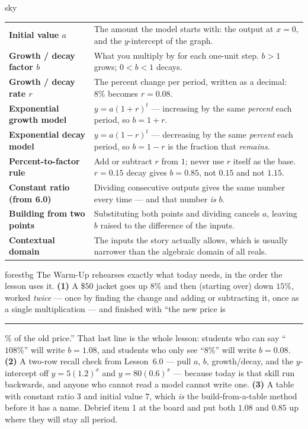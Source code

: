 \documentclass[10pt]{article}
\begin{document}
\begin{skillbox}{sky}
\renewcommand{\arraystretch}{1.3}
\begin{tabularx}{\linewidth}{@{}l X@{}}
\textbf{Initial value $a$} & The amount the model starts with: the output at $x=0$, and the $y$-intercept of the graph. \\
\textbf{Growth / decay factor $b$} & What you multiply by for each one-unit step. $b>1$ grows; $0<b<1$ decays. \\
\textbf{Growth / decay rate $r$} & The percent change per period, written as a decimal: $8\%$ becomes $r=0.08$. \\
\textbf{Exponential growth model} & $y=a(1+r)^{t}$ --- increasing by the same \emph{percent} each period, so $b=1+r$. \\
\textbf{Exponential decay model} & $y=a(1-r)^{t}$ --- decreasing by the same \emph{percent} each period, so $b=1-r$ is the fraction that \emph{remains}. \\
\textbf{Percent-to-factor rule} & Add or subtract $r$ from $1$; never use $r$ itself as the base. $r=0.15$ decay gives $b=0.85$, not $0.15$ and not $1.15$. \\
\textbf{Constant ratio (from 6.0)} & Dividing consecutive outputs gives the same number every time --- and that number \emph{is} $b$. \\
\textbf{Building from two points} & Substituting both points and dividing cancels $a$, leaving $b$ raised to the difference of the inputs. \\
\textbf{Contextual domain} & The inputs the story actually allows, which is usually narrower than the algebraic domain of all reals. \\
\end{tabularx}
\end{skillbox}

\begin{fixedskillbox}{forestbg}
    The Warm-Up rehearses exactly what today needs, in the order the lesson uses it. \textbf{(1)}
    A \$$50$ jacket goes up $8\%$ and then (starting over) down $15\%$, worked \emph{twice} --- once
    by finding the change and adding or subtracting it, once as a single multiplication --- and
    finished with ``the new price is \rule{0.7cm}{0.4pt}\% of the old price.'' That last line is the
    whole lesson: students who can say ``$108\%$'' will write $b=1.08$, and students who only see
    ``$8\%$'' will write $b=0.08$. \textbf{(2)} A two-row recall check from Lesson~6.0 --- pull $a$,
    $b$, growth/decay, and the $y$-intercept off $y=5(1.2)^{x}$ and $y=80(0.6)^{x}$ --- because
    today is that skill run backwards, and anyone who cannot read a model cannot write one.
    \textbf{(3)} A table with constant ratio $3$ and initial value $7$, which \emph{is} the
    build-from-a-table method before it has a name. Debrief item 1 at the board and put both
    $1.08$ and $0.85$ up where they will stay all period.
\end{fixedskillbox}
\end{document}
